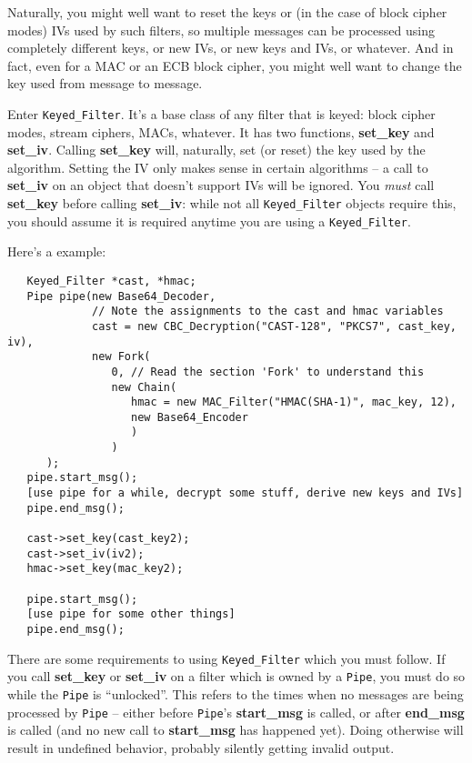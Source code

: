 \documentclass{article}
\newcommand{\function}[1]{\textbf{#1}}
\newcommand{\type}[1]{\texttt{#1}}
\begin{document}
Naturally, you might well want to reset the keys or (in the case of block
cipher modes) IVs used by such filters, so multiple messages can be processed
using completely different keys, or new IVs, or new keys and IVs, or whatever.
And in fact, even for a MAC or an ECB block cipher, you might well want to
change the key used from message to message.

Enter \type{Keyed\_Filter}. It's a base class of any filter that is keyed:
block cipher modes, stream ciphers, MACs, whatever. It has two functions,
\function{set\_key} and \function{set\_iv}. Calling \function{set\_key} will,
naturally, set (or reset) the key used by the algorithm. Setting the IV only
makes sense in certain algorithms -- a call to \function{set\_iv} on an object
that doesn't support IVs will be ignored. You \emph{must} call
\function{set\_key} before calling \function{set\_iv}: while not all
\type{Keyed\_Filter} objects require this, you should assume it is required
anytime you are using a \type{Keyed\_Filter}.

Here's a example:

\begin{verbatim}
   Keyed_Filter *cast, *hmac;
   Pipe pipe(new Base64_Decoder,
             // Note the assignments to the cast and hmac variables
             cast = new CBC_Decryption("CAST-128", "PKCS7", cast_key, iv),
             new Fork(
                0, // Read the section 'Fork' to understand this
                new Chain(
                   hmac = new MAC_Filter("HMAC(SHA-1)", mac_key, 12),
                   new Base64_Encoder
                   )
                )
      );
   pipe.start_msg();
   [use pipe for a while, decrypt some stuff, derive new keys and IVs]
   pipe.end_msg();

   cast->set_key(cast_key2);
   cast->set_iv(iv2);
   hmac->set_key(mac_key2);

   pipe.start_msg();
   [use pipe for some other things]
   pipe.end_msg();
\end{verbatim}

There are some requirements to using \type{Keyed\_Filter} which you must
follow. If you call \function{set\_key} or \function{set\_iv} on a filter which
is owned by a \type{Pipe}, you must do so while the \type{Pipe} is
``unlocked''. This refers to the times when no messages are being processed by
\type{Pipe} -- either before \type{Pipe}'s \function{start\_msg} is called, or
after \function{end\_msg} is called (and no new call to \function{start\_msg}
has happened yet). Doing otherwise will result in undefined behavior, probably
silently getting invalid output.
\end{document}
